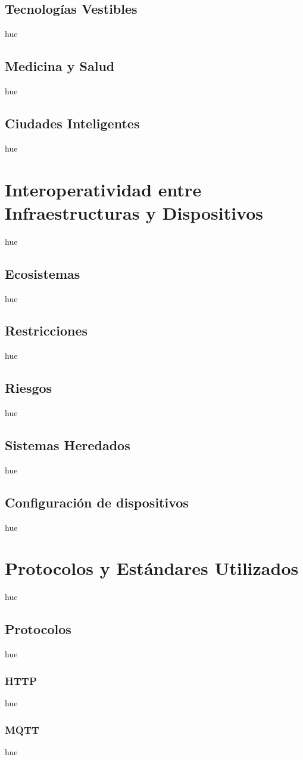 \subsection{Tecnologías Vestibles}
hue
\subsection{Medicina y Salud}
hue
\subsection{Ciudades Inteligentes}
hue

\section{Interoperatividad entre Infraestructuras y Dispositivos}
hue
\subsection{Ecosistemas}
hue
\subsection{Restricciones}
hue
\subsection{Riesgos}
hue
\subsection{Sistemas Heredados}
hue
\subsection{Configuración de dispositivos}
hue

\section{Protocolos y Estándares Utilizados}
hue
\subsection{Protocolos}
hue
\subsubsection{HTTP}
hue
\subsubsection{MQTT}
hue
